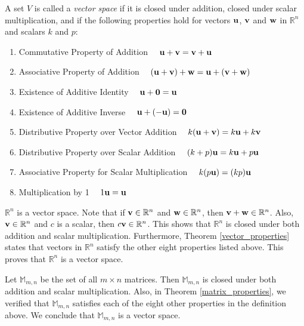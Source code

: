 \documentclass{ximera}
\begin{document}
 

  \begin{definition} 
  A set $V$ is called a \emph{vector space} if it is closed under addition, closed under scalar multiplication, and if the following properties hold for vectors ${\bf u}$, ${\bf v}$ and ${\bf w}$ in $\mathbb{R}^n$ and scalars $k$ and $p$:
  \begin{enumerate}
  \item 
  Commutative Property of Addition  $\quad {\bf u}+{\bf v}={\bf v}+{\bf u}$
  \item 
  Associative Property of Addition $\quad ({\bf u}+{\bf v})+{\bf w}={\bf u}+({\bf v}+{\bf w})$
  \item 
  Existence of Additive Identity  $\quad {\bf u}+{\bf 0}={\bf u}$
  \item 
  Existence of Additive Inverse  $\quad{\bf u}+(-{\bf u})={\bf 0}$
  \item
  Distributive Property over Vector Addition  $\quad k({\bf u}+{\bf v})=k{\bf u}+k{\bf v}$
  \item
  Distributive Property over Scalar Addition  $\quad (k+p){\bf u}=k{\bf u}+p{\bf u}$
  \item 
  Associative Property for Scalar Multiplication $\quad k(p{\bf u})=(kp){\bf u}$
  \item 
  Multiplication by 1 $\quad 1{\bf u}={\bf u}$
  \end{enumerate}
  
\end{definition}


\begin{example}
$\mathbb{R}^n$ is a vector space.  Note that if ${\bf v} \in \mathbb{R}^n$ and ${\bf w} \in \mathbb{R}^n$, then ${\bf v+w} \in \mathbb{R}^n$.  Also, ${\bf v} \in \mathbb{R}^n$ and $c$ is a scalar, then $c{\bf v} \in \mathbb{R}^n$.  This shows that $\mathbb{R}^n$ is closed under both addition and scalar multiplication.  Furthermore, Theorem \ref{vector_properties} states that vectors in $\mathbb{R}^n$ satisfy the other eight properties listed above.  This proves that $\mathbb{R}^n$ is a vector space.
\end{example}

\begin{example}
Let $\mathbb{M}_{m,n}$ be the set of all $m \times n$ matrices.  Then $\mathbb{M}_{m,n}$ is closed under both addition and scalar multiplication.  Also, in Theorem \ref{matrix_properties}, we verified that $\mathbb{M}_{m,n}$ satisfies each of the eight other properties in the definition above.  We conclude that $\mathbb{M}_{m,n}$ is a vector space.  
\end{example}
\end{document}
